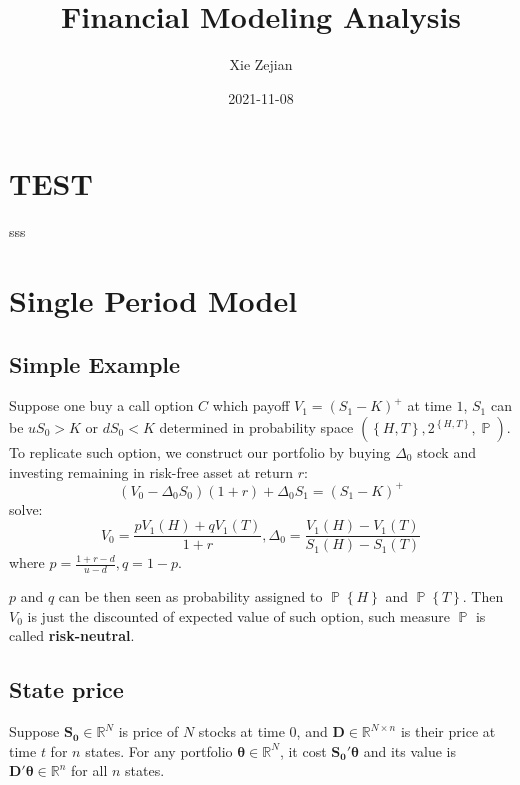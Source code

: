 \documentclass[
  12pt,
  oneside]{book}
\title{Financial Modeling Analysis}
\author{Xie Zejian}
\date{2021-11-08}
\newcommand{\bm}[1]{\symbf{#1}}
\theoremstyle{definition}
\theoremstyle{definition}
\theoremstyle{definition}
\theoremstyle{definition}
\theoremstyle{remark}
\begin{document}
\maketitle

{
\setcounter{tocdepth}{1}
\tableofcontents
}
\hypertarget{test}{%
\chapter{TEST}\label{test}}

sss

\hypertarget{single-period-model}{%
\chapter{Single Period Model}\label{single-period-model}}

\hypertarget{simple-example}{%
\section{Simple Example}\label{simple-example}}

Suppose one buy a call option \(C\) which payoff \(V_1=(S_1-K)^{+}\) at time \(1\), \(S_1\)
can be \(uS_0>K\) or \(dS_0<K\) determined in probability space \((\left\{ H,T \right\},2^{\left\{ H,T \right\}},\mathop{{}\mathbb{P}})\).
To replicate such option, we construct our portfolio by buying
\(\Delta_0\) stock and investing remaining in risk-free asset at return \(r\):
\[
(V_0-\Delta_0S_0)(1+r)+\Delta_0S_1=(S_1-K)^{+}
\]
solve:
\[
V_0=\frac{p V_1(H)+qV_1(T)}{1+r},\Delta_0= \frac{V_1(H)-V_1(T)}{S_1(H)-S_1(T)}
\]
where \(p=\frac{1+r-d}{u-d},q=1-p\).

\(p\) and \(q\) can be then seen as probability assigned to \(\mathop{{}\mathbb{P}}\left\{ H \right\}\) and \(\mathop{{}\mathbb{P}}\left\{ T \right\}\). Then \(V_0\) is just the discounted of expected value of such option, such measure \(\mathop{{}\mathbb{P}}\) is called \textbf{risk-neutral}.

\hypertarget{state-price}{%
\section{State price}\label{state-price}}

Suppose \(\bm{S_0}\in \mathbb{R}^{N}\) is price of \(N\) stocks at time \(0\),
and \(\bm{D}\in \mathbb{R}^{N\times n}\) is their price at time \(t\) for \(n\) states.
For any portfolio \(\bm{\theta}\in \mathbb{R}^{N}\), it cost \(\bm{S_0'\theta}\) and
its value is \(\bm{D'\theta}\in \mathbb{R}^{n}\) for all \(n\) states.
\end{document}
